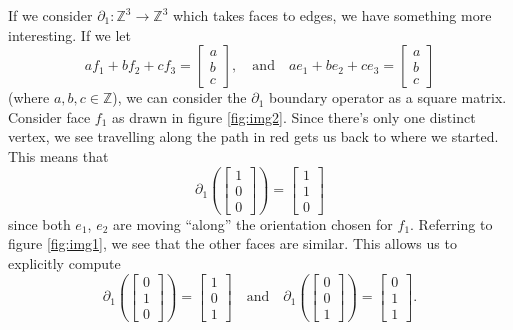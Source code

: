 If we consider $\partial_{1}:\mathbb{Z}^{3}\to\mathbb{Z}^{3}$
which takes faces to edges, we have something more interesting.
If we let
\begin{equation}%
af_{1}+bf_{2}+cf_{3} = \begin{bmatrix}a\\b\\c\end{bmatrix},\quad\text{and}\quad
ae_{1}+be_{2}+ce_{3} = \begin{bmatrix}a\\b\\c\end{bmatrix}
\end{equation}
(where $a,b,c\in\mathbb{Z}$), we can consider the $\partial_{1}$
boundary operator as a square matrix. Consider face $f_{1}$ as
drawn in figure \ref{fig:img2}. Since there's only one distinct
vertex, we see travelling along the path in red gets us back to
where we started. This means that
\begin{equation}%
\partial_{1}\left(\begin{bmatrix}1\\0\\0\end{bmatrix}\right) = \begin{bmatrix}1\\1\\0\end{bmatrix}
\end{equation}
since both $e_{1}$, $e_{2}$ are moving ``along'' the orientation
chosen for $f_{1}$. Referring to figure \ref{fig:img1}, we see
that the other faces are similar. This allows us to explicitly compute
\begin{equation}%
\partial_{1}\left(\begin{bmatrix}0\\1\\0\end{bmatrix}\right) = \begin{bmatrix}1\\0\\1\end{bmatrix}\quad\text{and}\quad
\partial_{1}\left(\begin{bmatrix}0\\0\\1\end{bmatrix}\right) = \begin{bmatrix}0\\1\\1\end{bmatrix}.
\end{equation}
